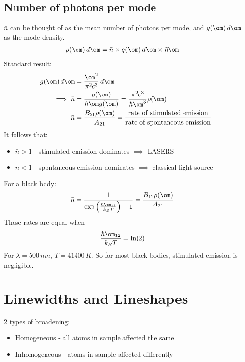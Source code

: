 \documentclass[a4paper, 11pt, normalem]{report}
\begin{document}
\section{Number of photons per mode}
$\bar{n}$ can be thought of as the mean number of photons per mode, and $g(\om)\,d\om$ as the mode density.
\begin{align}
    \rho(\om)\,d\om &= \bar{n} \times g(\om)\,d\om \times \hbar\om
\end{align}
Standard result:
\begin{align}
    g(\om)\,d\om &= \frac{\om^2}{\pi^2c^3}\,d\om \\
    \implies \bar{n} &= \frac{\rho(\om)}{\hbar\om g(\om)} = \frac{\pi^2c^3}{\hbar\om^3}\rho(\om)\\
    \bar{n} &= \frac{B_{21}\rho(\om)}{A_{21}} = \frac{\text{rate of stimulated emission}}{\text{rate of spontaneous emission}}
\end{align}
It follows that:
\begin{itemize}
    \item $\bar{n}>1$ - stimulated emission dominates $\implies$ LASERS
    \item $\bar{n}<1$ - spontaneous emission dominates $\implies$ classical light source
\end{itemize}
For a black body:
\begin{align}
    \bar{n} &= \frac{1}{\exp\left(\frac{\hbar\om_{12}}{k_BT}\right) -1} = \frac{B_{12}\rho(\om)}{A_{21}}
\end{align}
These rates are equal when
\begin{align}
    \frac{\hbar\om_{12}}{k_BT} &= \ln(2)
\end{align}
For $\lambda=500\,nm$, $T= 41400\,K$. So for most black bodies, stimulated emission is negligible.

\chapter{Linewidths and Lineshapes}
2 types of broadening:
\begin{itemize}
    \item Homogeneous - all atoms in sample affected the same
    \item Inhomogeneous - atoms in sample affected differently
\end{itemize}
\end{document}
